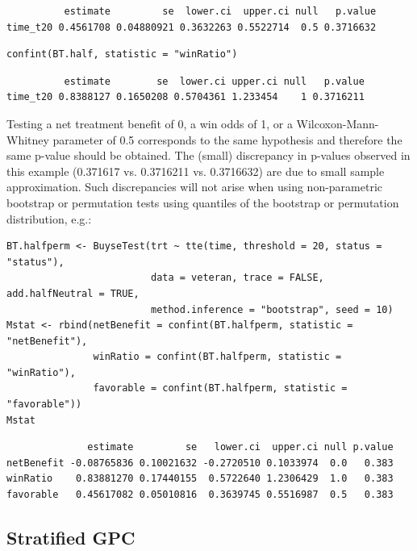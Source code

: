 \documentclass[12pt]{article}
\begin{document}
\begin{verbatim}
          estimate         se  lower.ci  upper.ci null   p.value
time_t20 0.4561708 0.04880921 0.3632263 0.5522714  0.5 0.3716632
\end{verbatim}


\lstset{language=r,label= ,caption= ,captionpos=b,numbers=none}
\begin{lstlisting}
confint(BT.half, statistic = "winRatio")
\end{lstlisting}

\begin{verbatim}
          estimate        se  lower.ci upper.ci null   p.value
time_t20 0.8388127 0.1650208 0.5704361 1.233454    1 0.3716211
\end{verbatim}


Testing a net treatment benefit of 0, a win odds of 1, or a
 Wilcoxon-Mann-Whitney parameter of 0.5 corresponds to the same
 hypothesis and therefore the same p-value should be obtained. The
 (small) discrepancy in p-values observed in this example (0.371617
 vs. 0.3716211 vs. 0.3716632) are due to small sample
 approximation. Such discrepancies will not arise when using
 non-parametric bootstrap or permutation tests using quantiles of the
 bootstrap or permutation distribution, e.g.:
\lstset{language=r,label= ,caption= ,captionpos=b,numbers=none}
\begin{lstlisting}
BT.halfperm <- BuyseTest(trt ~ tte(time, threshold = 20, status = "status"),
                         data = veteran, trace = FALSE, add.halfNeutral = TRUE,
                         method.inference = "bootstrap", seed = 10)
Mstat <- rbind(netBenefit = confint(BT.halfperm, statistic = "netBenefit"),
               winRatio = confint(BT.halfperm, statistic = "winRatio"),
               favorable = confint(BT.halfperm, statistic = "favorable"))
Mstat
\end{lstlisting}

\begin{verbatim}
              estimate         se   lower.ci  upper.ci null p.value
netBenefit -0.08765836 0.10021632 -0.2720510 0.1033974  0.0   0.383
winRatio    0.83881270 0.17440155  0.5722640 1.2306429  1.0   0.383
favorable   0.45617082 0.05010816  0.3639745 0.5516987  0.5   0.383
\end{verbatim}


\clearpage

\subsection{Stratified GPC}
\label{sec:org04b1e9c}
\end{document}
